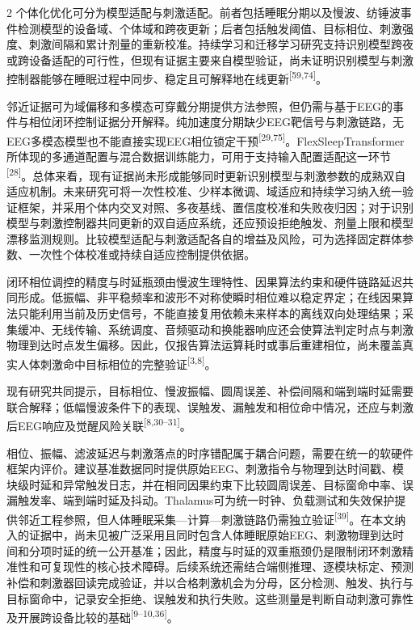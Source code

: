 \documentclass[UTF8,zihao=5,fontset=none]{ctexart}
\newcommand{\hei}{\CJKfamily{hei}}
\newcommand{\leveltwo}[1]{%
  \par\noindent{\hei\fontsize{10.5pt}{12.6pt}\selectfont\mdseries #1\par}}
\newcommand{\refcite}[1]{\nolinebreak[4]\textsuperscript{[#1]}}
\begin{document}
\begin{multicols}{2}
个体化优化可分为模型适配与刺激适配。前者包括睡眠分期以及慢波、纺锤波事件检测模型的设备域、个体域和跨夜更新；后者包括触发阈值、目标相位、刺激强度、刺激间隔和累计剂量的重新校准。持续学习和迁移学习研究支持识别模型跨夜或跨设备适配的可行性，但现有证据主要来自模型验证，尚未证明识别模型与刺激控制器能够在睡眠过程中同步、稳定且可解释地在线更新\refcite{59,74}。\par

邻近证据可为域偏移和多模态可穿戴分期提供方法参照，但仍需与基于EEG的事件与相位闭环控制证据分开解释。纯加速度分期缺少EEG靶信号与刺激链路，无EEG多模态模型也不能直接实现EEG相位锁定干预\refcite{29,75}。FlexSleepTransformer所体现的多通道配置与混合数据训练能力，可用于支持输入配置适配这一环节\refcite{28}。总体来看，现有证据尚未形成能够同时更新识别模型与刺激参数的成熟双自适应机制。未来研究可将一次性校准、少样本微调、域适应和持续学习纳入统一验证框架，并采用个体内交叉对照、多夜基线、置信度校准和失败夜归因；对于识别模型与刺激控制器共同更新的双自适应系统，还应预设拒绝触发、剂量上限和模型漂移监测规则。比较模型适配与刺激适配各自的增益及风险，可为选择固定群体参数、一次性个体校准或持续自适应控制提供依据。\par

\leveltwo{6.3 实时相位估计存在精度与时延双重瓶颈}

闭环相位调控的精度与时延瓶颈由慢波生理特性、因果算法约束和硬件链路延迟共同形成。低振幅、非平稳频率和波形不对称使瞬时相位难以稳定界定；在线因果算法只能利用当前及历史信号，不能直接复用依赖未来样本的离线双向处理结果；采集缓冲、无线传输、系统调度、音频驱动和换能器响应还会使算法判定时点与刺激物理到达时点发生偏移。因此，仅报告算法运算耗时或事后重建相位，尚未覆盖真实人体刺激命中目标相位的完整验证\refcite{3,8}。\par

现有研究共同提示，目标相位、慢波振幅、圆周误差、补偿间隔和端到端时延需要联合解释；低幅慢波条件下的表现、误触发、漏触发和相位命中情况，还应与刺激后EEG响应及觉醒风险关联\refcite{8,30--31}。\par

相位、振幅、滤波延迟与刺激落点的时序错配属于耦合问题，需要在统一的软硬件框架内评价。建议基准数据同时提供原始EEG、刺激指令与物理到达时间戳、模块级时延和异常触发日志，并在相同因果约束下比较圆周误差、目标窗命中率、误漏触发率、端到端时延及抖动。Thalamus可为统一时钟、负载测试和失效保护提供邻近工程参照，但人体睡眠采集—计算—刺激链路仍需独立验证\refcite{39}。在本文纳入的证据中，尚未见被广泛采用且同时包含人体睡眠原始EEG、刺激物理到达时间和分项时延的统一公开基准；因此，精度与时延的双重瓶颈仍是限制闭环刺激精准性和可复现性的核心技术障碍。后续系统还需结合端侧推理、逐模块标定、预测补偿和刺激器回读完成验证，并以合格刺激机会为分母，区分检测、触发、执行与目标窗命中，记录安全拒绝、误触发和执行失败。这些测量是判断自动刺激可靠性及开展跨设备比较的基础\refcite{9--10,36}。\par


\end{multicols}
\end{document}
